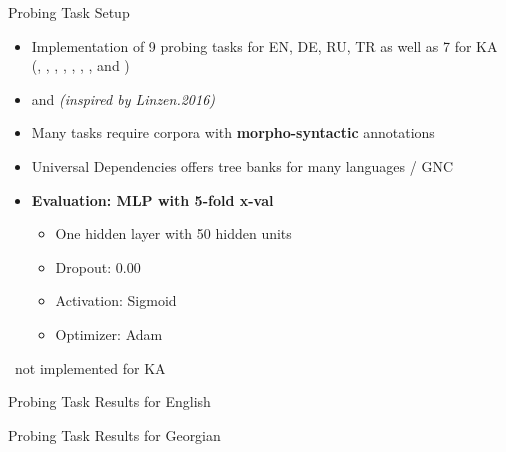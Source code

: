 \documentclass[accentcolor=tud1a,colorbacktitle,inverttitle,landscape,german,presentation,t]{tudbeamer}
\begin{document}
\begin{frame}{Probing Task Setup}{}
	\vspace*{-4mm}
	\begin{itemize}\setlength\itemsep{1em}
		\item Implementation of 9 probing tasks for EN, DE, RU, TR as well as 7 for KA \\
			{\footnotesize (, , , , \rs,
			, ,  and \rs)}
		\item {}  and  \textit{(inspired by Linzen.2016)}
		\item Many tasks require corpora with \textbf{morpho-syntactic} annotations
		\item Universal Dependencies offers tree banks for many languages / GNC
		\item \textbf{Evaluation: MLP with 5-fold x-val}
		\begin{itemize}
			\item One hidden layer with 50 hidden units
			\item Dropout: 0.00
			\item Activation: Sigmoid
			\item Optimizer: Adam
		\end{itemize}
	\end{itemize}

	\vfill
	{\footnotesize \rs\ not implemented for KA}
\end{frame}

\begin{frame}{Probing Task Results for English}{}
	\vspace*{-6mm}
	
\end{frame}

\begin{frame}{Probing Task Results for Georgian}{}
	\vspace*{-6mm}
	
\end{frame}
\end{document}
